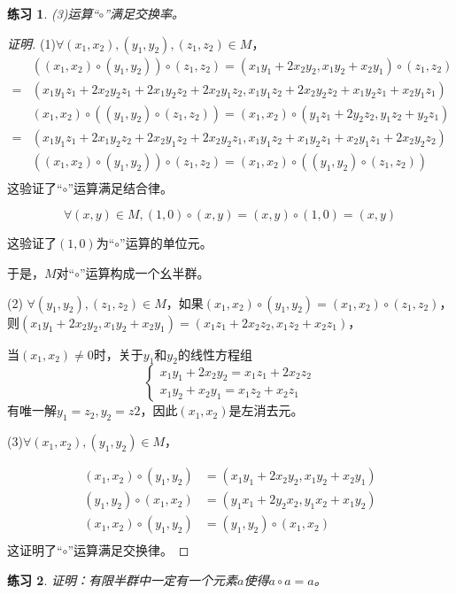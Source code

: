 \documentclass{article}
\newtheorem{Exercise}{练习}
\begin{document}
\begin{CJK*}{UTF8}{gbsn}
\begin{Exercise}
  (3)运算“$\circ$”满足交换率。
\end{Exercise}
\begin{proof}[证明]
  (1)$\forall (x_1,x_2), (y_1,y_2),(z_1,z_2)\in M$，
  \begin{align*}
    &((x_1,x_2)\circ (y_1,y_2))\circ (z_1,z_2) = (x_1y_1+2x_2y_2,x_1y_2+x_2y_1)\circ (z_1,z_2)\\
     =& (x_1y_1z_1+2x_2y_2z_1+2x_1y_2z_2+2x_2y_1z_2,x_1y_1z_2+2x_2y_2z_2+x_1y_2z_1+x_2y_1z_1)\\
     &(x_1,x_2)\circ ((y_1,y_2)\circ (z_1,z_2)) = (x_1,x_2)\circ (y_1z_1+2y_2z_2,y_1z_2+y_2z_1)\\
     =&(x_1y_1z_1+2x_1y_2z_2+2x_2y_1z_2+2x_2y_2z_1,x_1y_1z_2+x_1y_2z_1+x_2y_1z_1+2x_2y_2z_2)\\
  &((x_1,x_2)\circ (y_1,y_2))\circ (z_1,z_2) = (x_1,x_2)\circ ((y_1,y_2)\circ (z_1,z_2))\\
    \end{align*}
    这验证了“$\circ$”运算满足结合律。

  \[\forall (x,y)\in M,(1,0)\circ (x,y) = (x,y)\circ (1,0) = (x,y)\]
  
  这验证了$(1,0)$为“$\circ$”运算的单位元。
    
    
    于是，$M$对“$\circ$”运算构成一个幺半群。

(2) $\forall (y_1,y_2),(z_1,z_2)\in M$，如果$(x_1,x_2)\circ (y_1,y_2)=(x_1,x_2)\circ (z_1,z_2)$，
则$(x_1y_1+2x_2y_2,x_1y_2+x_2y_1)=(x_1z_1+2x_2z_2,x_1z_2+x_2z_1)$，

当$(x_1,x_2)\neq 0$时，关于$y_1$和$y_2$的线性方程组
\[
\begin{cases}
  x_1y_1+2x_2y_2=x_1z_1+2x_2z_2\\
  x_1y_2+x_2y_1=x_1z_2+x_2z_1
\end{cases}\]
有唯一解$y_1=z_2,y_2=z2$，因此$(x_1,x_2)$是左消去元。

(3)$\forall (x_1,x_2), (y_1,y_2)\in M$，

\begin{align*}
  (x_1,x_2)\circ (y_1,y_2) &= (x_1y_1+2x_2y_2,x_1y_2+x_2y_1)\\
  (y_1,y_2)\circ (x_1,x_2) &= (y_1x_1+2y_2x_2,y_1x_2+x_1y_2)\\
  (x_1,x_2)\circ (y_1,y_2) &= (y_1,y_2)\circ (x_1,x_2)\\
\end{align*}
这证明了“$\circ$”运算满足交换律。
\end{proof}

\begin{Exercise}
  证明：有限半群中一定有一个元素$a$使得$a\circ a=a$。
\end{Exercise}


\end{CJK*}
\end{document}
